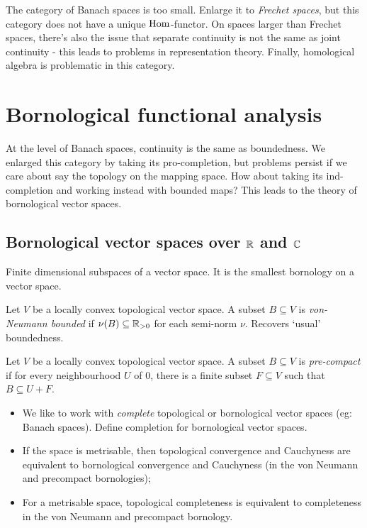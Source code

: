 The category of Banach spaces is too small. Enlarge it to \emph{Frechet spaces}, but this category does not have a unique \(\operatorname{Hom}\)-functor. On spaces larger than Frechet spaces, there's also the issue that separate continuity is not the same as joint continuity - this leads to problems in representation theory. Finally, homological algebra is problematic in this category. 

\section{Bornological functional analysis}

At the level of Banach spaces, continuity is the same as boundedness. We enlarged this category by taking its pro-completion, but problems persist if we care about say the topology on the mapping space. How about taking its ind-completion and working instead with bounded maps? This leads to the theory of bornological vector spaces. 


\subsection{Bornological vector spaces over \(\mathbb R\) and \(\mathbb C\)}



\begin{example}
Finite dimensional subspaces of a vector space. It is the smallest bornology on a vector space.
\end{example}

\begin{example}
Let \(V\) be a locally convex topological vector space. A subset \(B\subseteq V\) is \emph{von-Neumann bounded} if \(\nu(B) \subseteq \mathbb R_{>0}\) for each semi-norm \(\nu\). Recovers `usual' boundedness.  
\end{example}

\begin{example}
Let \(V\) be a locally convex topological vector space. A subset \(B \subseteq V\) is \emph{pre-compact} if for every neighbourhood \(U\) of \(0\), there is a finite subset \(F \subseteq V\) such that \(B \subseteq U + F\).  
\end{example}



\begin{itemize}
\item We like to work with \emph{complete} topological or bornological vector spaces (eg: Banach spaces). Define completion for bornological vector spaces.
\item If the space is metrisable, then topological convergence and Cauchyness are equivalent to bornological convergence and Cauchyness (in the von Neumann and precompact bornologies);
\item For a metrisable space, topological completeness is equivalent to completeness in the von Neumann and precompact bornology.

\end{itemize}



